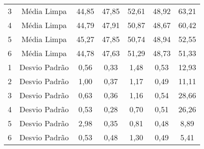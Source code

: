 \begin{table}[]
\begin{tabular}{|c|c|ccccc|}
3                         & Média Limpa                                                                & 44,85                     & 47,85                     & 52,61                     & 48,92                     & 63,21                      \\
4                         & Média Limpa                                                                & 44,79                     & 47,91                     & 50,87                     & 48,67                     & 60,42                      \\
5                         & Média Limpa                                                                & 45,27                     & 47,85                     & 50,74                     & 48,94                     & 52,55                      \\
6                         & Média Limpa                                                                & 44,78                     & 47,63                     & 51,29                     & 48,73                     & 51,33                      \\ \hline
1                         & Desvio Padrão                                                              & 0,56                      & 0,33                      & 1,48                      & 0,53                      & 12,93                      \\
2                         & Desvio Padrão                                                              & 1,00                      & 0,37                      & 1,17                      & 0,49                      & 11,11                      \\
3                         & Desvio Padrão                                                              & 0,63                      & 0,36                      & 1,16                      & 0,54                      & 28,66                      \\
4                         & Desvio Padrão                                                              & 0,53                      & 0,28                      & 0,70                      & 0,51                      & 26,26                      \\
5                         & Desvio Padrão                                                              & 2,98                      & 0,35                      & 0,81                      & 0,48                      & 8,89                       \\
6                         & Desvio Padrão                                                              & 0,53                      & 0,48                      & 1,30                      & 0,49                      & 5,41                       \\ \hline

\end{tabular}
\end{table}
